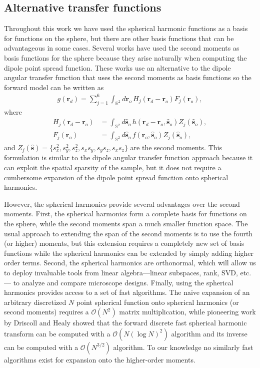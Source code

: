 \documentclass[]{osa-article}
\providecommand{\mc}[1]{\mathcal{#1}}
\providecommand{\ro}{\mathbf{\mathbf{r}}_o}
\providecommand{\so}{\mathbf{\hat{s}}_o}
\providecommand{\rd}{\mathbf{r}_d}
\providecommand{\mh}[1]{\mathbf{\hat{#1}}}
\providecommand{\mbb}[1]{\mathbb{#1}}
\begin{document}
\subsection{Alternative transfer functions}
Throughout this work we have used the spherical harmonic functions as a basis
for functions on the sphere, but there are other basis functions that can be
advantageous in some cases. Several works \cite{aguet2009, backer2014,
  brasselet2011, zhang2018, zhang2018-2} have used the second moments as basis
functions for the sphere because they arise naturally when computing the dipole
point spread function. These works use an alternative to the dipole angular
transfer function that uses the second moments as basis functions so the forward
model can be written as
\begin{align}
  g(\rd) = \sum_{j=1}^6 \int_{\mbb{R}^2}d\ro\, H_j(\rd - \ro)F_j(\ro),
\end{align}
where
\begin{align}
  H_j(\rd - \ro) &= \int_{\mbb{S}^2}d\so\, h(\rd - \ro, \so)Z_j(\so),\\
  F_j(\ro) &= \int_{\mbb{S}^2}d\so\, f(\ro, \so)Z_j(\so),
\end{align}
and $Z_j(\mh{s}) = \{s_x^2, s_y^2, s_z^2, s_xs_y, s_ys_z, s_xs_z\}$ are the
second moments. This formulation is similar to the dipole angular transfer
function approach because it can exploit the spatial sparsity of the sample, but
it does not require a cumbersome expansion of the dipole point spread function
onto spherical harmonics.

However, the spherical harmonics provide several advantages over the second
moments. First, the spherical harmonics form a complete basis for functions on
the sphere, while the second moments span a much smaller function space. The
usual approach to extending the span of the second moments is to use the fourth
(or higher) moments, but this extension requires a completely new set of basis
functions while the spherical harmonics can be extended by simply adding higher
order terms. Second, the spherical harmonics are orthonormal, which will allow
us to deploy invaluable tools from linear algebra---linear subspaces, rank, SVD,
etc.--- to analyze and compare microscope designs. Finally, using the spherical
harmonics provides access to a set of fast algorithms. The naive expansion of an
arbitrary discretized $N$ point spherical function onto spherical harmonics (or
second moments) requires a $\mc{O}(N^2)$ matrix multiplication, while pioneering
work by Driscoll and Healy \cite{driscoll1994} showed that the forward discrete
fast spherical harmonic transform can be computed with a $\mc{O}(N(\log N)^2)$
algorithm and its inverse can be computed with a $\mc{O}(N^{3/2})$ algorithm. To
our knowledge no similarly fast algorithms exist for expansion onto the
higher-order moments.
\end{document}
